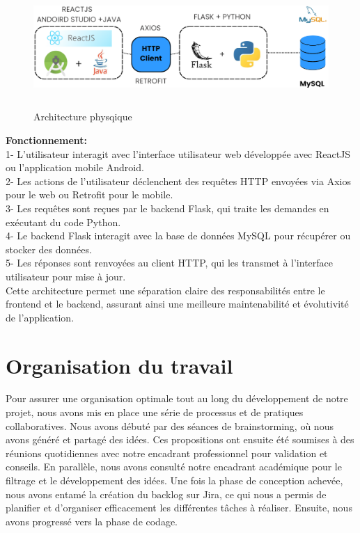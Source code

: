 \begin{figure}[ht]
    \centering
    \includegraphics[width=1\textwidth,height=4.6cm]{chap1.images/arch physique.png}
    \caption{Architecture physqique}
\end{figure}
\newpage
\textbf{Fonctionnement:}\\
1- L'utilisateur interagit avec l'interface utilisateur web développée avec ReactJS ou l'application mobile Android.\\
2- Les actions de l'utilisateur déclenchent des requêtes HTTP envoyées via Axios pour le web ou Retrofit pour le mobile.\\
3- Les requêtes sont reçues par le backend Flask, qui traite les demandes en exécutant du code Python.\\
4- Le backend Flask interagit avec la base de données MySQL pour récupérer ou stocker des données.\\
5- Les réponses sont renvoyées au client HTTP, qui les transmet à l'interface utilisateur pour mise à jour.\\

Cette architecture permet une séparation claire des responsabilités entre le frontend et le backend, assurant ainsi une meilleure maintenabilité et évolutivité de l'application.\\



\section{Organisation du travail}

Pour assurer une organisation optimale tout au long du développement de notre projet, nous avons mis en place une série de processus et de pratiques collaboratives. Nous avons débuté par des séances de brainstorming, où nous avons généré et partagé des idées. Ces propositions ont ensuite été soumises à des réunions quotidiennes avec notre encadrant professionnel pour validation et conseils. En parallèle, nous avons consulté notre encadrant académique pour le filtrage et le développement des idées. Une fois la phase de conception achevée, nous avons entamé la création du backlog sur Jira, ce qui nous a permis de planifier et d'organiser efficacement les différentes tâches à réaliser. Ensuite, nous avons progressé vers la phase de codage.\\

